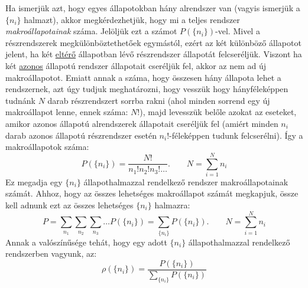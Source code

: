 \documentclass[../main.tex]{subfiles}
\begin{document}
Ha ismerjük azt, hogy egyes állapotokban hány alrendszer van (vagyis ismerjük a $\{n_i\}$ halmazt), akkor megkérdezhetjük, hogy mi a teljes rendszer \textit{makroállapotainak} száma.
Jelöljük ezt a számot $P(\{n_i\})$-vel. Mivel a részrendszerek megkülönböztethetőek egymástól, ezért az két különböző állapotot jelent, ha két \underline{eltérő} állapotban lévő részrendszer állapotát felcseréljük.
Viszont ha két \underline{azonos} állapotú rendszer állapotait cseréljük fel, akkor az nem ad új makroállapotot. Emiatt annak a száma, hogy összesen hány állapota lehet a rendszernek, azt úgy tudjuk meghatározni,
hogy vesszük hogy hányféleképpen tudnánk $N$ darab részrendszert sorrba rakni (ahol minden sorrend egy új makroállapot lenne, ennek száma: $N!$), majd levesszük belőle azokat az eseteket, amikor azonos állapotú alrendszerek állapotait cseréljük fel (amiért minden $n_i$ darab azonos állapotú részrendszer esetén $n_i!$-féleképpen tudunk felcserélni). Így a makroállapotok száma:
\begin{equation}
    P(\{n_i\}) = \frac{N!}{n_1! n_2! n_3! \ldots}. \qquad N = \sum_{i = 1}^N n_i
\end{equation}
Ez megadja egy $\{n_i\}$ állapothalmazzal rendelkező rendszer makroállapotainak számát. Ahhoz, hogy az összes lehetséges makroállapot számát megkapjuk, össze kell adnunk ezt az összes lehetséges $\{n_i\}$ halmazra:
\begin{equation}
    P = \sum_{n_1} \sum_{n_2} \sum_{n_3} \ldots P(\{n_i\}) = \sum_{\{n_i\}} P(\{n_i\}). \qquad N = \sum_{i = 1}^N n_i
\end{equation}
Annak a valószínűsége tehát, hogy egy adott $\{n_i\}$ állapothalmazzal rendelkező rendszerben vagyunk, az:
\begin{equation}
    \rho(\{n_i\}) = \frac{P(\{n_i\})}{\sum_{\{n_i\}} P(\{n_i\})}
\end{equation}
\end{document}
